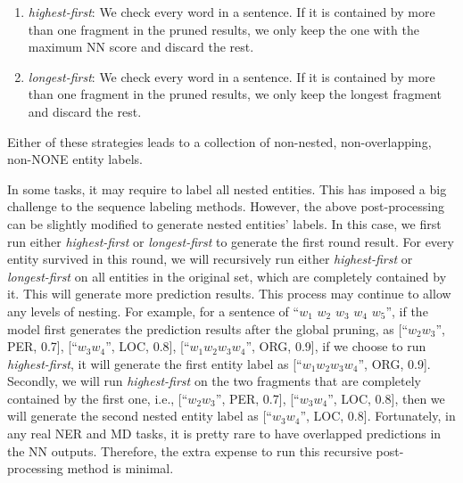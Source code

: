 \documentclass[11pt,a4paper]{article}
\begin{document}
\begin{enumerate}
	\item {\it highest-first}: We check every word in a sentence. If it is contained by more than one fragment in the pruned results, we only keep the one with the maximum NN score and discard the rest. 
	\item {\it longest-first}: We check every word in a sentence. If it is contained by more than one fragment in the pruned results, we only keep the longest fragment and discard the rest. 
\end{enumerate}
Either of these strategies leads to a collection of non-nested, non-overlapping, non-NONE entity labels.

In some tasks, it may require to label all nested entities. This has imposed a big challenge to the sequence labeling methods. However, the above post-processing can be slightly modified to generate nested entities' labels. In this case, we first run either {\it highest-first} or {\it longest-first} to generate the first round result. For every entity survived in this round, we will recursively run either {\it highest-first} or {\it longest-first} on all entities in the original set, which are completely contained by it. This will generate more prediction results. This process may continue to allow any levels of nesting. For example, for a sentence of ``$w_1$  $w_2$ $w_3$ $w_4$ $w_5$'', 
if the model first generates the prediction results  after the global pruning, as  [``$w_2 w_3$'', PER, 0.7], [``$w_3 w_4$'', LOC, 0.8], [``$w_1 w_2 w_3 w_4$'', ORG, 0.9], if we choose to run {\it highest-first}, it will generate the first entity label as [``$w_1 w_2 w_3 w_4$'', ORG, 0.9]. Secondly, we will run {\it highest-first} on the two fragments that are completely contained by the first one, i.e.,  [``$w_2 w_3$'', PER, 0.7], [``$w_3 w_4$'', LOC, 0.8], then we will generate the second nested entity label as [``$w_3 w_4$'', LOC, 0.8].
Fortunately, in any real NER and MD tasks, it is pretty rare to have overlapped predictions in the NN outputs. Therefore, the extra expense to run this recursive post-processing method is minimal. 
\end{document}
